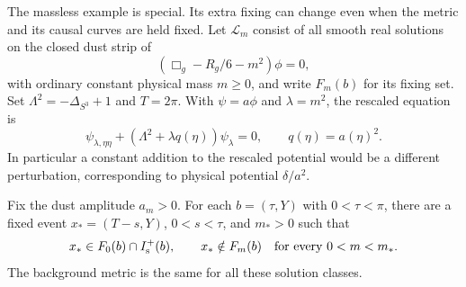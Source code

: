 The massless example is special. Its extra fixing can change even when the
metric and its causal curves are held fixed. Let $\mathcal L_m$ consist of
all smooth real solutions on the closed dust strip of
\[
 (\Box_g-R_g/6-m^2)\phi=0,
\]
with ordinary constant physical mass $m\ge0$, and write $F_m(b)$ for its
fixing set. Set $\Lambda^2=-\Delta_{S^3}+1$ and $T=2\pi$. With
$\psi=a\phi$ and $\lambda=m^2$, the rescaled equation is
\begin{equation}\label{eq:mass}
 \psi_{\lambda,\eta\eta}+(\Lambda^2+\lambda q(\eta))\psi_\lambda=0,
 \qquad q(\eta)=a(\eta)^2.
\end{equation}
In particular a constant addition to the rescaled potential would be a
different perturbation, corresponding to physical potential $\delta/a^2$.

\begin{proposition}\label{prop:mass}
Fix the dust amplitude $a_m>0$. For each $b=(\tau,Y)$ with $0<\tau<\pi$,
there are a fixed event
$x_*=(T-s,Y)$, $0<s<\tau$, and $m_*>0$ such that
\[
 x_*\in F_0(b)\cap I^+_{\mathrm s}(b),\qquad
 x_*\notin F_m(b)\quad\text{for every }0<m<m_*.
\]
The background metric is the same for all these solution classes.
\end{proposition}

